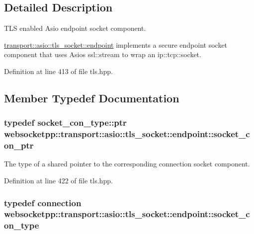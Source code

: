 \subsection{Detailed Description}
T\+L\+S enabled Asio endpoint socket component. 

\hyperlink{classwebsocketpp_1_1transport_1_1asio_1_1tls__socket_1_1endpoint}{transport\+::asio\+::tls\+\_\+socket\+::endpoint} implements a secure endpoint socket component that uses Asio\textquotesingle{}s ssl\+::stream to wrap an ip\+::tcp\+::socket. 

Definition at line 413 of file tls.\+hpp.



\subsection{Member Typedef Documentation}
\hypertarget{classwebsocketpp_1_1transport_1_1asio_1_1tls__socket_1_1endpoint_ad0babd14e53524633840467d072710c3}{}
\subsubsection[{socket\+\_\+con\+\_\+ptr}]{\setlength{\rightskip}{0pt plus 5cm}typedef {\bf socket\+\_\+con\+\_\+type\+::ptr} {\bf websocketpp\+::transport\+::asio\+::tls\+\_\+socket\+::endpoint\+::socket\+\_\+con\+\_\+ptr}}\label{classwebsocketpp_1_1transport_1_1asio_1_1tls__socket_1_1endpoint_ad0babd14e53524633840467d072710c3}
The type of a shared pointer to the corresponding connection socket component. 

Definition at line 422 of file tls.\+hpp.

\hypertarget{classwebsocketpp_1_1transport_1_1asio_1_1tls__socket_1_1endpoint_a690393b3da13e389cf025f88a3d38f3f}{}
\subsubsection[{socket\+\_\+con\+\_\+type}]{\setlength{\rightskip}{0pt plus 5cm}typedef {\bf connection} {\bf websocketpp\+::transport\+::asio\+::tls\+\_\+socket\+::endpoint\+::socket\+\_\+con\+\_\+type}}\label{classwebsocketpp_1_1transport_1_1asio_1_1tls__socket_1_1endpoint_a690393b3da13e389cf025f88a3d38f3f}



